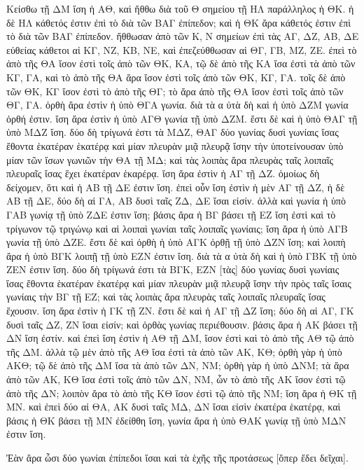 \begin{Parallel}{}{}
{{\greekfont Κείσθω τῇ ΔΜ ἴση ἡ ΑΘ, καὶ ἤθθω διὰ τοῦ Θ σημείου τῇ
ΗΛ παράλληλος ἡ ΘΚ. ἡ δὲ ΗΛ κάθετός ἐστιν ἐπὶ τὸ διὰ
τῶν ΒΑΓ ἐπίπεδον; καὶ ἡ ΘΚ ἄρα κάθετός ἐστιν ἐπὶ
τὸ διὰ τῶν ΒΑΓ ἐπίπεδον. ἤθθωσαν ἀπὸ τῶν Κ, Ν
σημείων ἐπὶ τὰς ΑΓ, ΔΖ, ΑΒ, ΔΕ εὐθείας κάθετοι αἱ ΚΓ, ΝΖ,
ΚΒ, ΝΕ, καὶ ἐπεζεύθθωσαν αἱ ΘΓ, ΓΒ, ΜΖ, ΖΕ. ἐπεὶ τὸ ἀπὸ
τῆς ΘΑ ἴσον ἐστὶ τοῖς ἀπὸ τῶν ΘΚ, ΚΑ, τῷ δὲ ἀπὸ
τῆς ΚΑ ἴσα ἐστὶ τὰ ἀπὸ τῶν ΚΓ, ΓΑ, καὶ τὸ ἀπὸ
τῆς ΘΑ ἄρα
 ἴσον ἐστὶ τοῖς ἀπὸ τῶν  ΘΚ, ΚΓ, ΓΑ.
τοῖς δὲ ἀπὸ τῶν ΘΚ, ΚΓ ἴσον ἐστὶ τὸ ἀπὸ τῆς ΘΓ;
τὸ ἄρα ἀπὸ τῆς ΘΑ ἴσον ἐστὶ τοῖς ἀπὸ τῶν
ΘΓ, ΓΑ. ὀρθὴ ἄρα ἐστὶν ἡ ὑπὸ ΘΓΑ γωνία. διὰ τὰ α ὐτὰ
δὴ καὶ ἡ ὑπὸ ΔΖΜ γωνία ὀρθή ἐστιν. ἴση ἄρα ἐστὶν
ἡ ὑπὸ ΑΓΘ γωνία τῇ ὑπὸ ΔΖΜ. ἔστι δὲ καὶ ἡ
ὑπὸ ΘΑΓ τῇ ὑπὸ ΜΔΖ ἴση. δύο δὴ τρίγωνά ἐστι
τὰ ΜΔΖ, ΘΑΓ δύο γωνίας δυσὶ γωνίαις ἴσας ἔθοντα
ἑκατέραν ἑκατέρᾳ καὶ μίαν πλευρὰν μιᾷ πλευρᾷ
ἴσην τὴν ὑποτείνουσαν ὑπὸ μίαν τῶν ἴσων γωνιῶν
τὴν ΘΑ τῇ ΜΔ; καὶ τὰς λοιπὰς ἄρα πλευρὰς ταῖς λοιπαῖς
πλευραῖς ἴσας ἕχει ἑκατέραν ἑκαρέρᾳ. ἴση ἄρα ἐστὶν
ἡ ΑΓ τῇ ΔΖ. ὁμοίως δὴ δείχομεν, ὅτι καὶ
ἡ ΑΒ τῇ ΔΕ ἐστιν ἴση. ἐπεὶ οὖν ἴση ἐστὶν ἡ
μὲν ΑΓ τῇ ΔΖ, ἡ δὲ ΑΒ τῇ ΔΕ, δύο δὴ αἱ ΓΑ, ΑΒ δυσὶ
ταῖς
ΖΔ, ΔΕ ἴσαι εἰσίν. ἀλλὰ καὶ γωνία ἡ ὑπὸ
ΓΑΒ γωνίᾳ τῇ ὑπὸ ΖΔΕ ἐστιν ἴση; βάσις ἄρα ἡ ΒΓ βάσει
τῇ ΕΖ  ἴση ἐστὶ καὶ τὸ τρίγωνον τῷ τριγώνῳ καὶ αἱ λοιπαὶ
γωνίαι ταῖς λοιπαῖς γωνίαις;
ἴση ἄρα ἡ ὑπὸ ΑΓΒ γωνία τῇ ὑπὸ ΔΖΕ. ἔστι δὲ
καὶ ὀρθὴ ἡ ὑπὸ ΑΓΚ ὀρθῇ τῇ ὑπὸ ΔΖΝ ἴση; καὶ
λοιπὴ ἄρα ἡ ὑπὸ ΒΓΚ λοιπῇ τῇ ὑπὸ ΕΖΝ ἐστιν
ἴση. διὰ τὰ α ὐτὰ δὴ καὶ ἡ ὑπὸ ΓΒΚ τῇ ὑπὸ ΖΕΝ
ἐστιν ἴση.
δύο δὴ τρίγωνά ἐστι τὰ ΒΓΚ, ΕΖΝ
[τὰς] δύο γωνίας δυσὶ γωνίαις ἴσας ἔθοντα ἑκατέραν
ἑκατέρᾳ καὶ μίαν πλευρὰν μιᾷ πλευρᾷ ἴσην τὴν πρὸς
ταῖς ἴσαις γωνίαις τὴν ΒΓ τῇ ΕΖ; καὶ τὰς λοιπὰς
ἄρα πλευρὰς ταῖς λοιπαῖς πλευραῖς ἴσας ἕχουσιν.
ἴση ἄρα ἐστὶν ἡ ΓΚ τῇ ΖΝ. ἔστι δὲ καὶ ἡ ΑΓ τῇ
ΔΖ ἴση; δύο δὴ αἱ ΑΓ, ΓΚ δυσὶ ταῖς ΔΖ, ΖΝ ἴσαι
εἰσίν; καὶ ὀρθὰς γωνίας περιέθουσιν. βάσις ἄρα ἡ ΑΚ βάσει
τῇ ΔΝ ἴση ἐστίν. καὶ ἐπεὶ ἴση ἐστὶν ἡ ΑΘ τῇ
ΔΜ, ἴσον ἐστὶ καὶ τὸ ἀπὸ τῆς ΑΘ τῷ ἀπὸ
τῆς ΔΜ. ἀλλὰ τῷ μὲν ἀπὸ τῆς ΑΘ
 ἴσα ἐστὶ τὰ
ἀπὸ τῶν ΑΚ, ΚΘ; ὀρθὴ γὰρ ἡ ὑπὸ ΑΚΘ; τῷ δὲ
ἀπὸ τῆς ΔΜ ἴσα τὰ ἀπὸ τῶν ΔΝ, ΝΜ; ὀρθὴ γὰρ
ἡ ὑπὸ ΔΝΜ; τὰ ἄρα ἀπὸ τῶν ΑΚ, ΚΘ ἴσα
ἐστὶ τοῖς ἀπὸ τῶν ΔΝ, ΝΜ, ὧν τὸ ἀπὸ τῆς ΑΚ
ἴσον ἐστὶ τῷ  ἀπὸ τῆς ΔΝ; λοιπὸν ἄρα τὸ ἀπὸ
τῆς ΚΘ ἴσον ἐστὶ τῷ ἀπὸ τῆς ΝΜ; ἴση ἄρα ἡ ΘΚ
τῇ ΜΝ. καὶ ἐπεὶ δύο αἱ ΘΑ, ΑΚ δυσὶ ταῖς ΜΔ, ΔΝ
ἴσαι εἰσὶν ἑκατέρα ἑκατέρᾳ, καὶ βάσις ἡ ΘΚ βάσει
τῇ ΜΝ ἐδείθθη ἴση, γωνία ἄρα ἡ ὑπὸ ΘΑΚ γωνίᾳ
τῇ ὑπὸ ΜΔΝ ἐστιν ἴση.}

{\greekfont Ἐὰν ἄρα ὦσι δύο γωνίαι ἐπίπεδοι ἴσαι καὶ τὰ
ἑχῆς τῆς προτάσεως [ὅπερ ἔδει δεῖχαι].}}


\end{Parallel}
